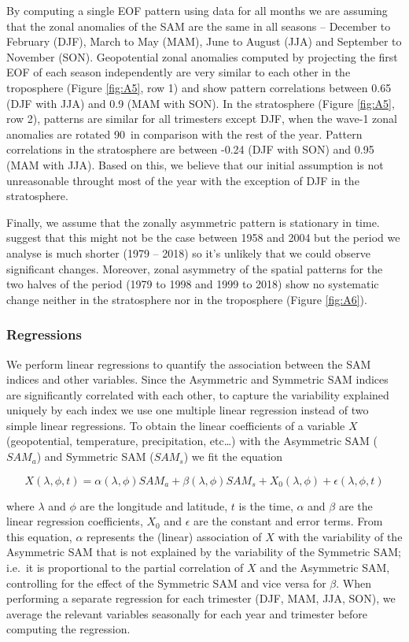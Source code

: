 \documentclass[smallextended]{svjour3}       %
\begin{document}
By computing a single EOF pattern using data for all months we are assuming that the zonal anomalies of the SAM are the same in all seasons -- December to February (DJF), March to May (MAM), June to August (JJA) and September to November (SON). Geopotential zonal anomalies computed by projecting the first EOF of each season independently are very similar to each other in the troposphere (Figure \ref{fig:A5}, row 1) and show pattern correlations between 0.65 (DJF with JJA) and 0.9 (MAM with SON). In the stratosphere (Figure \ref{fig:A5}, row 2), patterns are similar for all trimesters except DJF, when the wave-1 zonal anomalies are rotated 90\degree~in comparison with the rest of the year. Pattern correlations in the stratosphere are between -0.24 (DJF with SON) and 0.95 (MAM with JJA). Based on this, we believe that our initial assumption is not unreasonable throught most of the year with the exception of DJF in the stratosphere.

Finally, we assume that the zonally asymmetric pattern is stationary in time. \citet{silvestri2009} suggest that this might not be the case between 1958 and 2004 but the period we analyse is much shorter (1979 -- 2018) so it's unlikely that we could observe significant changes. Moreover, zonal asymmetry of the spatial patterns for the two halves of the period (1979 to 1998 and 1999 to 2018) show no systematic change neither in the stratosphere nor in the troposphere (Figure \ref{fig:A6}).

\hypertarget{regressions}{%
\subsubsection{Regressions}\label{regressions}}

We perform linear regressions to quantify the association between the SAM indices and other variables. Since the Asymmetric and Symmetric SAM indices are significantly correlated with each other, to capture the variability explained uniquely by each index we use one multiple linear regression instead of two simple linear regressions. To obtain the linear coefficients of a variable \(X\) (geopotential, temperature, precipitation, etc\ldots{}) with the Asymmetric SAM (\(SAM_a\)) and Symmetric SAM (\(SAM_s\)) we fit the equation

\[
X(\lambda, \phi, t) = \alpha(\lambda, \phi) SAM_a + \beta(\lambda, \phi) SAM_s + X_0(\lambda, \phi) +  \epsilon(\lambda, \phi, t)
\]

where \(\lambda\) and \(\phi\) are the longitude and latitude, \(t\) is the time, \(\alpha\) and \(\beta\) are the linear regression coefficients, \(X_0\) and \(\epsilon\) are the constant and error terms. From this equation, \(\alpha\) represents the (linear) association of \(X\) with the variability of the Asymmetric SAM that is not explained by the variability of the Symmetric SAM; i.e.~it is proportional to the partial correlation of \(X\) and the Asymmetric SAM, controlling for the effect of the Symmetric SAM and vice versa for \(\beta\). When performing a separate regression for each trimester (DJF, MAM, JJA, SON), we average the relevant variables seasonally for each year and trimester before computing the regression.
\end{document}
